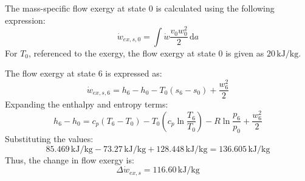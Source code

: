 The mass-specific flow exergy at state 0 is calculated using the following expression:  
\[
\dot{w}_{ex,s,0} = \int \dot{w} \frac{v_0 w_0^2}{2} \, \text{d}a
\]  
For \( T_0 \), referenced to the exergy, the flow exergy at state 0 is given as \( 20 \, \text{kJ/kg} \).  

The flow exergy at state 6 is expressed as:  
\[
\dot{w}_{ex,s,6} = h_6 - h_0 - T_0 (s_6 - s_0) + \frac{w_6^2}{2}
\]  
Expanding the enthalpy and entropy terms:  
\[
h_6 - h_0 = c_p (T_6 - T_0) - T_0 \left( c_p \ln \frac{T_6}{T_0} \right) - R \ln \frac{p_6}{p_0} + \frac{w_6^2}{2}
\]  
Substituting the values:  
\[
85.469 \, \text{kJ/kg} - 73.27 \, \text{kJ/kg} + 128.448 \, \text{kJ/kg} = 136.605 \, \text{kJ/kg}
\]  
Thus, the change in flow exergy is:  
\[
\Delta \dot{w}_{ex,s} = 116.60 \, \text{kJ/kg}
\]